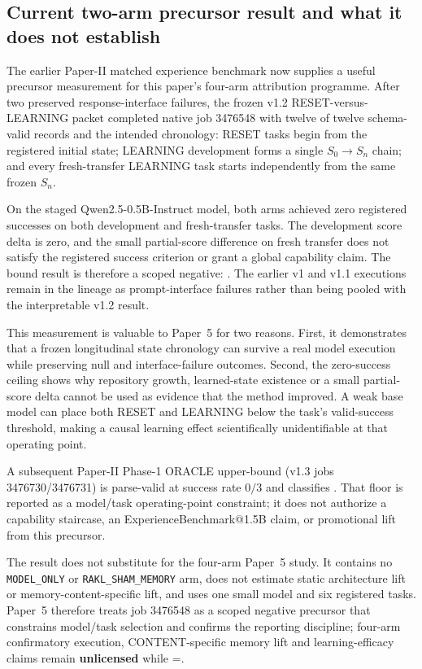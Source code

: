 \subsection{Current two-arm precursor result and what it does not establish}

The earlier Paper-II matched experience benchmark now supplies a useful precursor measurement for this paper's four-arm attribution programme.  After two preserved response-interface failures, the frozen v1.2 RESET-versus-LEARNING packet completed native job 3476548 with twelve of twelve schema-valid records and the intended chronology: RESET tasks begin from the registered initial state; LEARNING development forms a single $S_0\rightarrow S_n$ chain; and every fresh-transfer LEARNING task starts independently from the same frozen $S_n$.

On the staged Qwen2.5-0.5B-Instruct model, both arms achieved zero
registered successes on both development and fresh-transfer tasks.  The
development score delta is zero, and the small partial-score difference on
fresh transfer does not satisfy the registered success criterion or grant a
global capability claim.  The bound result is therefore a scoped negative:
.
The earlier v1 and v1.1 executions remain in the lineage as prompt-interface
failures rather than being pooled with the interpretable v1.2 result.

This measurement is valuable to Paper~5 for two reasons.  First, it demonstrates that a frozen longitudinal state chronology can survive a real model execution while preserving null and interface-failure outcomes.  Second, the zero-success ceiling shows why repository growth, learned-state existence or a small partial-score delta cannot be used as evidence that the method improved.  A weak base model can place both RESET and LEARNING below the task's valid-success threshold, making a causal learning effect scientifically unidentifiable at that operating point.

A subsequent Paper-II Phase-1 ORACLE upper-bound (v1.3 jobs 3476730/3476731) is parse-valid at success rate $0/3$ and classifies .  That floor is reported as a model/task operating-point constraint; it does not authorize a capability staircase, an ExperienceBenchmark@1.5B claim, or promotional lift from this precursor.

The result does not substitute for the four-arm Paper~5 study.  It contains no \texttt{MODEL\_ONLY} or \texttt{RAKL\_SHAM\_MEMORY} arm, does not estimate static architecture lift or memory-content-specific lift, and uses one small model and six registered tasks.  Paper~5 therefore treats job 3476548 as a scoped negative precursor that constrains model/task selection and confirms the reporting discipline; four-arm confirmatory execution, CONTENT-specific memory lift and learning-efficacy claims remain \textbf{unlicensed} while =.

